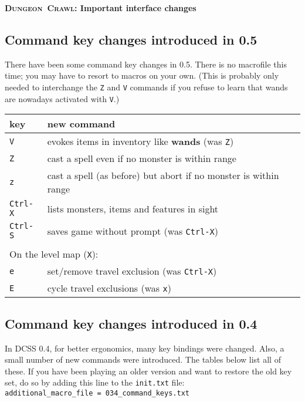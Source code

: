 \documentclass[a4paper,10pt]{article}
\newcommand{\key}[1]{{\texttt{#1}}} %
\newcommand{\crawl}{\textsc{Crawl}}
\newcommand{\dungeon}{\textsc{Dungeon}}
\begin{document}
\begin{center}\textbf{\LARGE
\dungeon\ \crawl: Important interface changes
}\end{center}

\subsection*{Command key changes introduced in 0.5}

There have been some command key changes in 0.5. There is no macrofile this time; you may have to resort to macros on your own. 
(This is probably only needed to interchange the \key{Z} and \key{V} commands if you refuse to learn that wands are nowadays
activated with \key{V}.)

\begin{center}
\begin{tabular}{ll}
key          & new command \\ \hline
\key{V}      & evokes items in inventory like \textbf{wands} (was \key{Z}) \\
\key{Z}      & cast a spell even if no monster is within range \\
\key{z}      & cast a spell (as before) but abort if no monster is within range \\
\key{Ctrl-X} & lists monsters, items and features in sight \\
\key{Ctrl-S} & saves game without prompt (was \key{Ctrl-X}) \\
\\
\multicolumn{2}{l}{On the level map (\key{X}):} \\
\key{e}      & set/remove travel exclusion (was \key{Ctrl-X}) \\
\key{E}      & cycle travel exclusions (was \key{x})
\end{tabular}
\end{center}

\newpage

\subsection*{Command key changes introduced in 0.4}

In DCSS 0.4, for better ergonomics, many key bindings were changed. Also,
a small number of new commands were introduced. The tables below list all 
of these. If you have been playing an older version and want to restore 
the old key set, do so by adding this line to the 
\texttt{init.txt} file: \\
\verb$additional_macro_file = 034_command_keys.txt$ 
\end{document}
